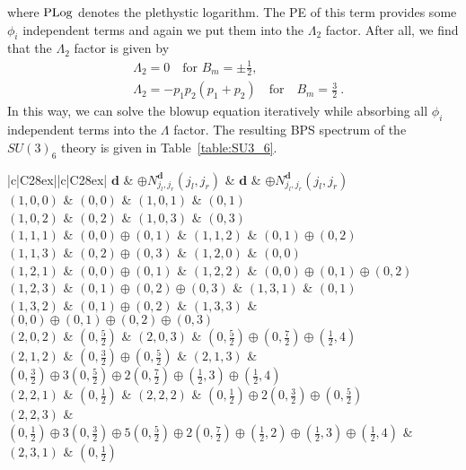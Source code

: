 where $ \operatorname{PLog} $ denotes the plethystic logarithm. The PE of this term provides some $\phi_i$ independent terms and again we put them into the $ \Lambda_2 $ factor. After all, we find that the $ \Lambda_2 $ factor is given by
\begin{align}
&\Lambda_2 = 0 \quad \text{for } B_m = \pm \tfrac{1}{2}, \nonumber \\
&\Lambda_2 = -p_1 p_2 (p_1 + p_2) \quad \text{for} \quad B_m = \tfrac{3}{2} \ .
\end{align}
In this way, we can solve the blowup equation iteratively while absorbing all $\phi_i$ independent terms into the $ \Lambda $ factor. The resulting BPS spectrum of the $ SU(3)_6 $ theory is given in Table~\ref{table:SU3_6}.
\begin{table}
	\centering
	\begin{tabular}{|c|C{28ex}||c|C{28ex}|} \hline
		$ \mathbf{d} $ & $\oplus N_{j_l, j_r}^{\mathbf{d}} (j_l, j_r)$ & $ \mathbf{d} $ & $\oplus N_{j_l, j_r}^{\mathbf{d}} (j_l, j_r)$ \\ \hline
		$ (1, 0, 0) $ & $ (0, 0) $ & $ (1, 0, 1) $ & $ (0, 1) $ \\ \hline
		$ (1, 0, 2) $ & $ (0, 2) $ & $ (1, 0, 3) $ & $ (0, 3) $ \\ \hline
		$ (1, 1, 1) $ & $ (0, 0) \oplus (0, 1) $ & $ (1, 1, 2) $ & $ (0, 1) \oplus (0, 2) $ \\ \hline
		$ (1, 1, 3) $ & $ (0, 2) \oplus (0, 3) $ & $ (1, 2, 0) $ & $ (0, 0) $ \\ \hline
		$ (1, 2, 1) $ & $ (0, 0) \oplus (0, 1) $ & $ (1, 2, 2) $ & $ (0, 0) \oplus (0, 1) \oplus (0, 2) $ \\ \hline
		$ (1, 2, 3) $ & $ (0, 1) \oplus (0, 2) \oplus (0, 3) $ & $ (1, 3, 1) $ & $ (0, 1) $ \\ \hline
		$ (1, 3, 2) $ & $ (0,1) \oplus (0,2) $ & $ (1, 3, 3) $ & $ (0,0) \oplus (0,1) \oplus (0,2) \oplus (0,3) $ \\ \hline
		$ (2, 0, 2) $ & $ (0, \frac{5}{2}) $ & $ (2, 0, 3) $ & $ (0,\frac{5}{2}) \oplus (0,\frac{7}{2}) \oplus (\frac{1}{2},4) $ \\ \hline
		$ (2, 1, 2) $ & $ (0, \frac{3}{2}) \oplus (0, \frac{5}{2}) $ & $ (2, 1, 3) $ & $ (0,\frac{3}{2}) \oplus 3(0,\frac{5}{2}) \oplus 2(0,\frac{7}{2}) \oplus (\frac{1}{2},3) \oplus (\frac{1}{2},4) $ \\ \hline
		$ (2, 2, 1) $ & $ (0, \frac{1}{2}) $ & $ (2, 2, 2) $ & $ (0, \frac{1}{2}) \oplus 2(0, \frac{3}{2}) \oplus (0, \frac{5}{2}) $ \\ \hline
		$ (2, 2, 3) $ & $ (0,\frac{1}{2}) \oplus 3(0,\frac{3}{2}) \oplus 5(0,\frac{5}{2}) \oplus 2(0,\frac{7}{2}) \oplus (\frac{1}{2},2) \oplus (\frac{1}{2},3) \oplus (\frac{1}{2},4) $ & $ (2, 3, 1) $ & $ (0, \frac{1}{2}) $ \\ \hline

\end{tabular}
\end{table}
